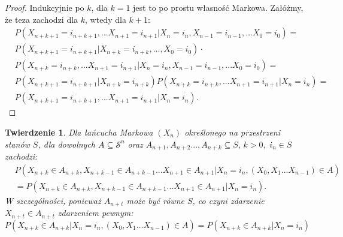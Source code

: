 \documentclass[a4paper]{article}
\theoremstyle{defn}
\theoremstyle{theorem}
\newtheorem{theorem}[defn]{Twierdzenie}
\theoremstyle{lemma}
\theoremstyle{cor}
\theoremstyle{fact}
\begin{document}
\begin{proof}
Indukcyjnie po $k$, dla $k = 1$ jest to po prostu własność Markowa. Załóżmy, że teza zachodzi dla $k$, wtedy dla $k+1$:
\begin{align*}
    &P(X_{n+k+1} = i_{n+k+1}, ...X_{n+1} = i_{n+1} | X_n = i_n, X_{n-1} = i_{n-1}, ... X_0 = i_0) = \\
    &P(X_{n+k+1} = i_{n+k+1}|X_{n+k} = i_{n+k}, ..., X_0 = i_0) \cdot\\
    &P(X_{n+k} = i_{n+k}, ...X_{n+1} = i_{n+1} | X_n = i_n, X_{n-1} = i_{n-1}, ... X_0 = i_0) = \\
    & P(X_{n+k+1} = i_{n+k+1}|X_{n+k} = i_{n+k})P(X_{n+k} = i_{n+k}, ...X_{n+1} = i_{n+1} | X_n = i_n) =\\
    & P(X_{n+k+1} = i_{n+k+1}, ...X_{n+1} = i_{n+1}| X_n = i_n).
\end{align*}
\end{proof}
\begin{theorem}\label{theorem2.1.4}
Dla łańcucha Markowa $(X_n)$ określonego na przestrzeni stanów $S$, dla dowolnych $A \subseteq \mathcal{S}^n$ oraz $A_{n+1}, A_{n+2}..., A_{n+k} \subseteq S,\, k>0, \,\, i_n \in S$ zachodzi:
\\
\begin{align*}
&P(X_{n+k} \in A_{n+k}, X_{n+k-1} \in A_{n+k-1}...X_{n+1} \in A_{n+1}|X_n = i_n, (X_{0}, X_{1} ... X_{n-1}) \in A)\\
&= P(X_{n+k} \in A_{n+k}, X_{n+k-1} \in A_{n+k-1}...X_{n+1} \in A_{n+1}|X_n = i_n).
\end{align*}
W szczególności, ponieważ $A_{n+t}$ może być równe $S$, co czyni zdarzenie $X_{n+t} \in A_{n+t}$ zdarzeniem pewnym:\\
$$P(X_{n+k} \in A_{n+k}|X_n = i_n, (X_{0}, X_{1} ... X_{n-1}) \in A) = P(X_{n+k} \in A_{n+k}|X_n = i_n)$$
\end{theorem}
\end{document}
